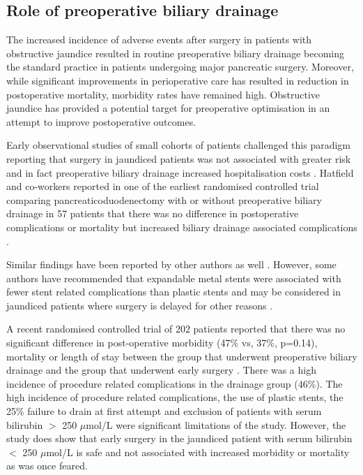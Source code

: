 \subsection{Role of preoperative biliary drainage}
\label{sec:preoperative_biliary_drainage}
The increased incidence of adverse events after surgery in patients with obstructive jaundice resulted in routine preoperative biliary drainage becoming the standard practice in patients undergoing major pancreatic surgery. 
Moreover, while significant improvements in perioperative care has resulted in reduction in postoperative mortality, morbidity rates have remained high. 
Obstructive jaundice has provided a potential target for preoperative optimisation in an attempt to improve postoperative outcomes. 

Early observational studies of small cohorts of patients challenged this paradigm reporting that surgery in jaundiced patients was not associated with greater risk and in fact preoperative biliary drainage increased hospitalisation costs \parencite{snellen_influence_1985, bakkevold_morbidity_1993, pitt_does_1985}. 
Hatfield and co-workers reported in one of the earliest randomised controlled trial comparing pancreaticoduodenectomy with or without preoperative biliary drainage in 57 patients that there was no difference in postoperative complications or mortality but increased biliary drainage associated complications \parencite{hatfield_preoperative_1982}.

Similar findings have been reported by other authors as well \parencite{lai_preoperative_1994, lai_preoperative_1994, jagannath_effect_2005}. 
However, some authors have recommended that expandable metal stents were associated with fewer stent related complications than plastic stents and may be considered in jaundiced patients where surgery is delayed for other reasons \parencite{wasan_use_2005, mullen_pancreaticoduodenectomy_2005}.

A recent randomised controlled trial of 202 patients reported that there was no significant difference in post-operative morbidity (47\% vs, 37\%, p=0.14), mortality or length of stay between the group that underwent preoperative biliary drainage and the group that underwent early surgery \parencite{van_der_gaag_preoperative_2010}. 
There was a high incidence of procedure related complications in the drainage group (46\%). 
The high incidence of procedure related complications, the use of plastic stents, the 25\% failure to drain at first attempt and exclusion of patients with serum bilirubin $>$ 250 $\mu$mol/L were significant limitations of the study. 
However, the study does show that early surgery in the jaundiced patient with serum bilirubin $<$ 250 $\mu$mol/L is safe and not associated with increased morbidity or mortality as was once feared. 

